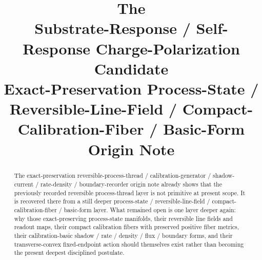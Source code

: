 \documentclass[11pt]{article}
\title{\textbf{The \TheoryName{}}\\[0.4em]
\large Substrate-Response / Self-Response Charge-Polarization Candidate\\
\large Exact-Preservation Process-State / Reversible-Line-Field / Compact-Calibration-Fiber / Basic-Form\\
\large Origin Note}
\author{}
\date{}
\begin{document}
\maketitle

\begin{abstract}
The exact-preservation reversible-process-thread / calibration-generator / shadow-current / rate-density / boundary-recorder origin note already shows that the previously recorded reversible process-thread layer is not primitive at present scope. It is recovered there from a still deeper process-state / reversible-line-field / compact-calibration-fiber / basic-form layer. What remained open is one layer deeper again: why those exact-preserving process-state manifolds, their reversible line fields and readout maps, their compact calibration fibers with preserved positive fiber metrics, their calibration-basic shadow / rate / density / flux / boundary forms, and their transverse-convex fixed-endpoint action should themselves exist rather than becoming the present deepest disciplined postulate.


\end{abstract}
\end{document}
